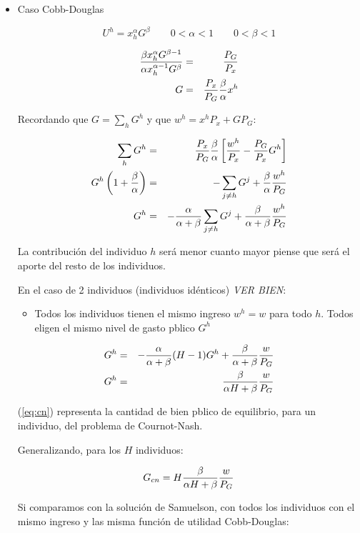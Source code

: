 \begin{itemize}
	\item Caso Cobb-Douglas
	
	$$U^h=x_h^\alpha G^\beta \qquad 0<\alpha<1 \qquad 0<\beta<1 $$
	
	
\begin{eqnarray}
	{\beta x_h^\alpha G^{\beta-1} \over \alpha x_h^{\alpha-1}G^{\beta}} &=& {P_G \over P_x} \nonumber \\
	G &=& {P_x \over P_G}{\beta \over \alpha} x^h \nonumber 
\end{eqnarray}
	
	Recordando que $G=\sum_{h} G^h$ y que $w^h=x^h P_x+G P_G$:
	
	
\begin{eqnarray}
	\sum_{h} G^h &=& {P_x \over P_G}{\beta \over \alpha} \left[ \frac{w^h}{P_x}-\frac{P_G}{P_x}G^h \right] \nonumber \\
	G^h \left(1+ {\beta \over \alpha} \right)&=& -\sum_{j \not= h} G^j+{\beta \over \alpha}{w^h \over P_G} \nonumber \\
	G^h &=& -{\alpha \over \alpha + \beta} \sum_{j \not= h} G^j + {\beta \over \alpha + \beta}{w^h \over P_G}
\end{eqnarray}
	
	La contribución del individuo $h$ será menor cuanto mayor piense que será el aporte del resto de los individuos.
	
	En el caso de 2 individuos (individuos idénticos) \emph{VER BIEN}: 
	
\begin{itemize}
	\item Todos los individuos tienen el mismo ingreso $w^h=w$ para todo $h$. Todos eligen el mismo nivel de gasto pblico $G^h$
\end{itemize}

\begin{eqnarray}
	G^h &=& -{\alpha \over \alpha + \beta} (H-1) G^h + {\beta \over \alpha + \beta}{w \over P_G} \nonumber \\
	G^h &=& {\beta \over \alpha H + \beta} {w \over P_G} \label{eq:cn}
\end{eqnarray}
	
(\ref{eq:cn}) representa la cantidad de bien pblico de equilibrio, para un individuo, del problema de Cournot-Nash.

Generalizando, para los $H$ individuos:

$$G_{cn}=	H{\beta \over \alpha H + \beta} {w \over P_G} $$

Si comparamos con la solución de Samuelson, con todos los individuos con el mismo ingreso y  las misma función de utilidad Cobb-Douglas:


\end{itemize}
